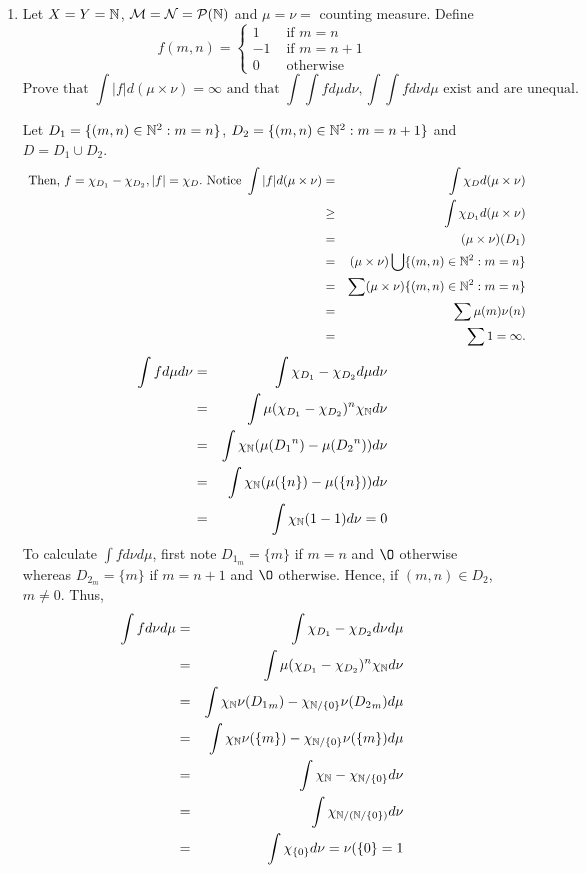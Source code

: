 \begin{enumerate}
\item Let $X=Y={\mathbb N}$, ${\mathcal M}={\mathcal N}={\mathcal P}({\mathbb N})$ and $\mu=\nu=$ counting measure. Define \[ f(m,n)= \left\{
\begin{array}{ll}
1 & \text{ if } m=n\\
-1 & \text{ if } m=n+1 \\
0 & \text{ otherwise }
\end{array}
 \right. \]
 \[
\text{Prove that } \int |f|d(\mu \times \nu) = \infty \text{ and that } \int \int f d \mu d \nu, \int \int f d \nu d \mu \text{ exist and are unequal. }
\]
\begin{pf}
Let $D_1= \{(m,n) \in {\mathbb N}^2 : m = n\}$, $D_2= \{ (m,n) \in {\mathbb N}^2 : m=n+1 \}$ and $D = D_1 \cup D_2$. \begin{eqnarray*}
	\text{ Then, } f=\chi_{D_1}-\chi_{D_2}, |f| = \chi_{D}. \text{ Notice }
 \int |f|d(\mu \times \nu) & = & \int \chi_{D} d(\mu \times \nu) \\
	& \geq & \int \chi_{D_1}d(\mu \times \nu)  \\
	& = & (\mu \times \nu)(D_1)  \\
	& = & (\mu \times \nu) \bigcup\{(m,n) \in {\mathbb N}^2 : m=n \}   \\
	& = & \sum (\mu \times \nu) \{(m,n) \in {\mathbb N}^2 : m=n \}   \\
	& = & \sum \mu(m) \nu(n)    \\
	& = & \sum 1  = \infty. 
\end{eqnarray*}
\begin{eqnarray*}
	\int f d\mu d \nu & = & \int \chi_{D_1}-\chi_{D_2} d\mu d \nu \\
	& = & \int \mu (\chi_{D_1}-\chi_{D_2})^n \chi_{\mathbb N} d\nu  \\
		& = & \int  \chi_{{\mathbb N}}(\mu({D_1}^n)-\mu({D_2}^n) ) d\nu  \\
	& = & \int  \chi_{{\mathbb N}}(\mu(\{n\})-\mu(\{n\}) ) d\nu     \\
	& = & \int  \chi_{{\mathbb N}}(1-1 ) d\nu =0  
\end{eqnarray*}
To calculate $\int f d\nu d \mu$, first note $D_{1_m}= \{ m\}$ if $m=n$ and $\O$ otherwise whereas $D_{2_m}=\{m\}$ if $m=n+1$ and $\O$ otherwise. Hence, if $(m,n) \in D_2$, $m \neq 0$. Thus, 
	\begin{eqnarray*}
	\int f d\nu d \mu & = & \int \chi_{D_1}-\chi_{D_2} d\nu d \mu \\
	& = & \int \mu (\chi_{D_1}-\chi_{D_2})^n \chi_{\mathbb N} d\nu  \\
		& = & \int  \chi_{{\mathbb N}}\nu({D_1}_m)-\chi_{{\mathbb N} \slash \{0\}}\nu({D_2}_m)  d\mu  \\
	& = & \int  \chi_{{\mathbb N}}\nu(\{m\})-\chi_{{\mathbb N} \slash \{0\}}\nu(\{m\})  d\mu  \\    
	& = & \int  \chi_{{\mathbb N}}- \chi_{{\mathbb N} \slash \{0\}}d\nu \\
	& = & \int  \chi_{{\mathbb N}\slash ({\mathbb N} \slash \{0\})}d\nu \\
	& = & \int  \chi_{\{0\}}d\nu = \nu(\{0\}=1
\end{eqnarray*}
\end{pf}

\end{enumerate}